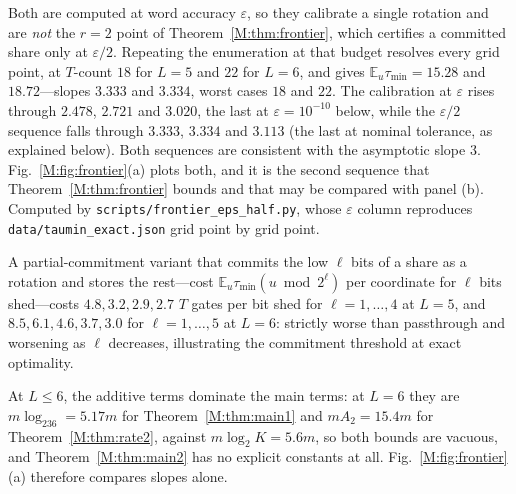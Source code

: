 \documentclass[aps,prx,twocolumn,superscriptaddress,nofootinbib,longbibliography]{revtex4-2}
\theoremstyle{plain}
\theoremstyle{definition}
\theoremstyle{remark}
\newcommand{\E}{\mathbb{E}}
\begin{document}
Both are computed at word accuracy $\varepsilon$, so they calibrate a single rotation and are \emph{not} the $r=2$ point of Theorem~\ref{M:thm:frontier}, which certifies a committed share only at $\varepsilon/2$. Repeating the enumeration at that budget resolves every grid point, at $T$-count $18$ for $L=5$ and $22$ for $L=6$, and gives $\E_u\tau_{\min}=15.28$ and $18.72$---slopes $3.333$ and $3.334$, worst cases $18$ and $22$. The calibration at $\varepsilon$ rises through $2.478$, $2.721$ and $3.020$, the last at $\varepsilon=10^{-10}$ below, while the $\varepsilon/2$ sequence falls through $3.333$, $3.334$ and $3.113$ (the last at nominal tolerance, as explained below). Both sequences are consistent with the asymptotic slope $3$. Fig.~\ref{M:fig:frontier}(a) plots both, and it is the second sequence that Theorem~\ref{M:thm:frontier} bounds and that may be compared with panel (b). Computed by \texttt{scripts/frontier\_eps\_half.py}, whose $\varepsilon$ column reproduces \texttt{data/taumin\_exact.json} grid point by grid point. 

A partial-commitment variant that commits the low $\ell$ bits of a share as a rotation and stores the rest---cost $\E_u\tau_{\min}(u\bmod2^\ell)$ per coordinate for $\ell$ bits shed---costs $4.8,3.2,2.9,2.7$ $T$ gates per bit shed for $\ell=1,\dots,4$ at $L=5$, and $8.5,6.1,4.6,3.7,3.0$ for $\ell=1,\dots,5$ at $L=6$: strictly worse than passthrough and worsening as $\ell$ decreases, illustrating the commitment threshold at exact optimality. 

At $L\le6$, the additive terms dominate the main terms: at $L=6$ they are $m\log_236=5.17m$ for Theorem~\ref{M:thm:main1} and $mA_2=15.4m$ for Theorem~\ref{M:thm:rate2}, against $m\log_2K=5.6m$, so both bounds are vacuous, and Theorem~\ref{M:thm:main2} has no explicit constants at all. Fig.~\ref{M:fig:frontier}(a) therefore compares slopes alone.
\end{document}
